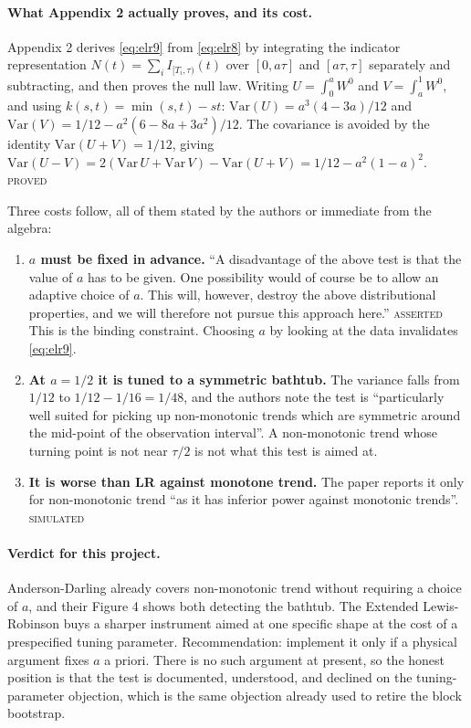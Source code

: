 \documentclass[11pt,a4paper]{article}
\newcommand{\Wbridge}{W^{0}}
\newcommand{\PROVED}{\textsc{\textcolor{blue!55!black}{proved}}}
\newcommand{\SIMULATED}{\textsc{\textcolor{orange!70!black}{simulated}}}
\newcommand{\ASSERTED}{\textsc{\textcolor{purple!70!black}{asserted}}}
\begin{document}
\paragraph{What Appendix 2 actually proves, and its cost.}
Appendix 2 derives \eqref{eq:elr9} from \eqref{eq:elr8} by integrating the indicator
representation $N(t) = \sum_i I_{[T_i,\tau)}(t)$ over $[0,a\tau]$ and $[a\tau,\tau]$
separately and subtracting, and then proves the null law. Writing
$U = \int_0^a \Wbridge$ and $V = \int_a^1 \Wbridge$, and using
$k(s,t) = \min(s,t) - st$:
$\mathrm{Var}(U) = a^3(4-3a)/12$ and
$\mathrm{Var}(V) = 1/12 - a^2(6-8a+3a^2)/12$. The covariance is avoided by the identity
$\mathrm{Var}(U+V) = 1/12$, giving
$\mathrm{Var}(U-V) = 2(\mathrm{Var}\,U + \mathrm{Var}\,V) - \mathrm{Var}(U+V)
= 1/12 - a^2(1-a)^2$. \PROVED

Three costs follow, all of them stated by the authors or immediate from the algebra:

\begin{enumerate}[leftmargin=1.6em,itemsep=3pt]
\item \textbf{$a$ must be fixed in advance.} \enquote{A disadvantage of the above test
is that the value of $a$ has to be given. One possibility would of course be to allow an
adaptive choice of $a$. This will, however, destroy the above distributional properties,
and we will therefore not pursue this approach here.} \ASSERTED{} This is the binding
constraint. Choosing $a$ by looking at the data invalidates \eqref{eq:elr9}.

\item \textbf{At $a = 1/2$ it is tuned to a symmetric bathtub.} The variance falls from
$1/12$ to $1/12 - 1/16 = 1/48$, and the authors note the test is
\enquote{particularly well suited for picking up non-monotonic trends which are
symmetric around the mid-point of the observation interval}. A non-monotonic trend whose
turning point is not near $\tau/2$ is not what this test is aimed at.

\item \textbf{It is worse than LR against monotone trend.} The paper reports it only for
non-monotonic trend \enquote{as it has inferior power against monotonic trends}.
\SIMULATED
\end{enumerate}

\paragraph{Verdict for this project.} Anderson-Darling already covers non-monotonic
trend without requiring a choice of $a$, and their Figure 4 shows both detecting the
bathtub. The Extended Lewis-Robinson buys a sharper instrument aimed at one specific
shape at the cost of a prespecified tuning parameter. Recommendation: implement it only
if a physical argument fixes $a$ a priori. There is no such argument at present, so the
honest position is that the test is documented, understood, and declined on the
tuning-parameter objection, which is the same objection already used to retire the block
bootstrap.
\end{document}

